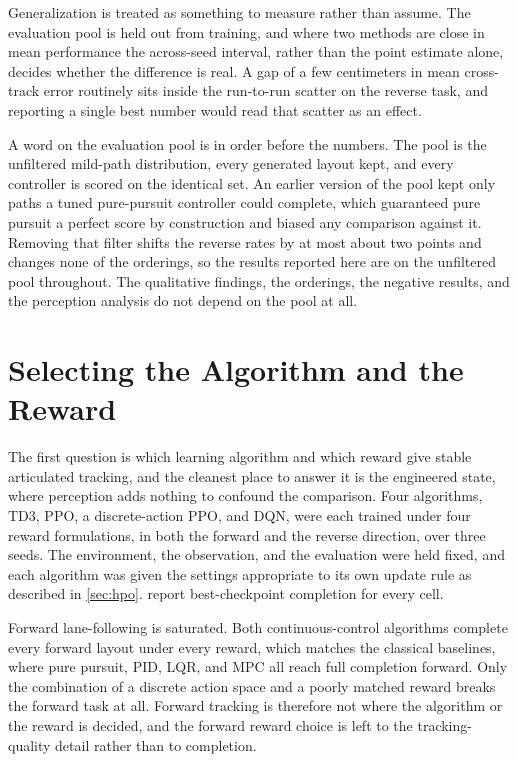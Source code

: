 Generalization is treated as something to measure rather than assume. The evaluation pool is held out from training, and where two methods are close in mean performance the across-seed interval, rather than the point estimate alone, decides whether the difference is real. A gap of a few centimeters in mean cross-track error routinely sits inside the run-to-run scatter on the reverse task, and reporting a single best number would read that scatter as an effect.

A word on the evaluation pool is in order before the numbers. The pool is the unfiltered mild-path distribution, every generated layout kept, and every controller is scored on the identical set. An earlier version of the pool kept only paths a tuned pure-pursuit controller could complete, which guaranteed pure pursuit a perfect score by construction and biased any comparison against it. Removing that filter shifts the reverse rates by at most about two points and changes none of the orderings, so the results reported here are on the unfiltered pool throughout. The qualitative findings, the orderings, the negative results, and the perception analysis do not depend on the pool at all.

\section{Selecting the Algorithm and the Reward}
\label{sec:algo_reward}

The first question is which learning algorithm and which reward give stable articulated tracking, and the cleanest place to answer it is the engineered state, where perception adds nothing to confound the comparison. Four algorithms, TD3, PPO, a discrete-action PPO, and DQN, were each trained under four reward formulations, in both the forward and the reverse direction, over three seeds. The environment, the observation, and the evaluation were held fixed, and each algorithm was given the settings appropriate to its own update rule as described in \cref{sec:hpo}.  report best-checkpoint completion for every cell.




Forward lane-following is saturated. Both continuous-control algorithms complete every forward layout under every reward, which matches the classical baselines, where pure pursuit, PID, LQR, and MPC all reach full completion forward. Only the combination of a discrete action space and a poorly matched reward breaks the forward task at all. Forward tracking is therefore not where the algorithm or the reward is decided, and the forward reward choice is left to the tracking-quality detail rather than to completion.

